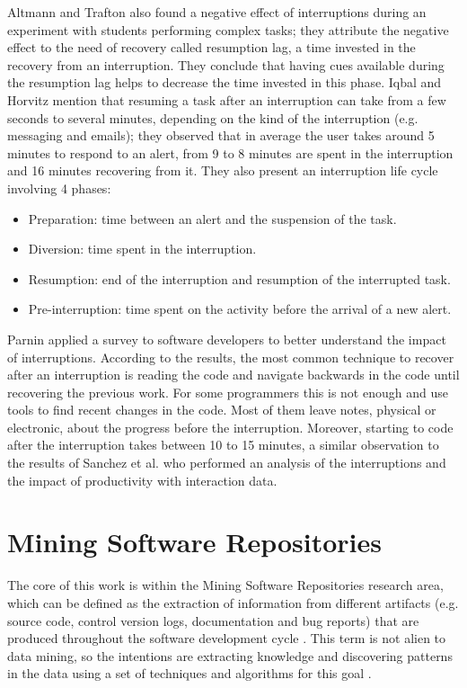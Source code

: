 Altmann and Trafton \cite{AT04} also found a negative effect of interruptions during an experiment with students performing complex tasks; they attribute the negative effect to the need of recovery called resumption lag, a time invested in the recovery from an interruption. They conclude that having cues available during the resumption lag helps to decrease the time invested in this phase. Iqbal and Horvitz \cite{IH07} mention that resuming a task after an interruption can take from a few seconds to several minutes, depending on the kind of the interruption (e.g. messaging and emails); they observed that in average the user takes around 5 minutes to respond to an alert, from 9 to 8 minutes are spent in the interruption and 16 minutes recovering from it. They also present an interruption life cycle involving 4 phases: 
\begin{itemize}
	\item Preparation: time between an alert and the suspension of the task.
	\item Diversion: time spent in the interruption.
	\item Resumption: end of the interruption and resumption of the interrupted task.
	\item Pre-interruption: time spent on the activity before the arrival of a new alert.
\end{itemize}
Parnin \cite{PD10} applied a survey to software developers to better understand the impact of interruptions. According to the results, the most common technique to recover after an interruption is reading the code and navigate backwards in the code until recovering the previous work. For some programmers this is not enough and use tools to find recent changes in the code. Most of them leave notes, physical or electronic, about the progress before the interruption. Moreover, starting to code after the interruption takes between 10 to 15 minutes, a similar observation to the results of Sanchez et al. \cite{SRV15} who performed an analysis of the interruptions and the impact of productivity with interaction data.


\section{Mining Software Repositories}
The core of this work is within the Mining Software Repositories research area, which can be defined as the extraction of information from different artifacts (e.g. source code, control version logs, documentation and bug reports) that are produced throughout the software development cycle \cite{H04}. This term is not alien to data mining, so the intentions are extracting knowledge and discovering patterns in the data using a set of techniques and algorithms for this goal \cite{FPG96}.

